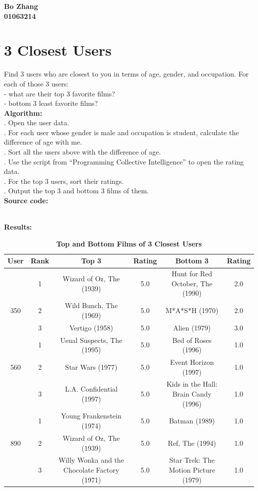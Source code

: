 \documentclass{article}
\begin{document}
		\begin{center}\textbf{Bo Zhang\\01063214}
		\end{center}
		\section{3 Closest Users}
		Find 3 users who are closest to you in terms of age, gender, and occupation. For each of those 3 users:\\
		- what are their top 3 favorite films?\\
		- bottom 3 least favorite films?\\

		\noindent\textbf{Algorithm: }\\
		. Open the user data.\\
		. For each user whose gender is male and occupation is student, calculate the difference of age with me.\\
		. Sort all the users above with the difference of age.\\
		. Use the script from ``Programming Collective Intelligence'' to open the rating data.\\
		. For the top 3 users, sort their ratings.\\
		. Output the top 3 and bottom 3 films of them.\\

		\noindent\textbf{Source code:}
		

		\noindent\\\textbf{Results:}
		\begin{table}[!htb]
			\centering
			\caption{\textbf{Top and Bottom Films of 3 Closest Users}}
			\begin{tabular}{cccccc}
				\toprule
				\textbf{User} & \textbf{Rank} & \textbf{Top 3} & \textbf{Rating} & \textbf{Bottom 3} & \textbf{Rating}\\
				\midrule
				& 1 & Wizard of Oz, The (1939) & 5.0 & Hunt for Red October, The (1990) & 2.0\\
				350 & 2 & Wild Bunch, The (1969) & 5.0 & M*A*S*H (1970) & 2.0\\
				& 3 & Vertigo (1958) & 5.0 & Alien (1979) & 3.0\\
				& 1 & Usual Suspects, The (1995) & 5.0 & Bed of Roses (1996) & 1.0\\
				560 & 2 & Star Wars (1977) & 5.0 & Event Horizon (1997) & 1.0\\
				& 3 & L.A. Confidential (1997) & 5.0 & Kids in the Hall: Brain Candy (1996) & 1.0\\
				& 1 & Young Frankenstein (1974) & 5.0 & Batman (1989) & 1.0\\
				890 & 2 & Wizard of Oz, The (1939) & 5.0 & Ref, The (1994) & 1.0\\
				& 3 & Willy Wonka and the Chocolate Factory (1971) & 5.0 & Star Trek: The Motion Picture (1979) & 1.0\\
				\bottomrule
			\end{tabular}
		\end{table}
\end{document}
